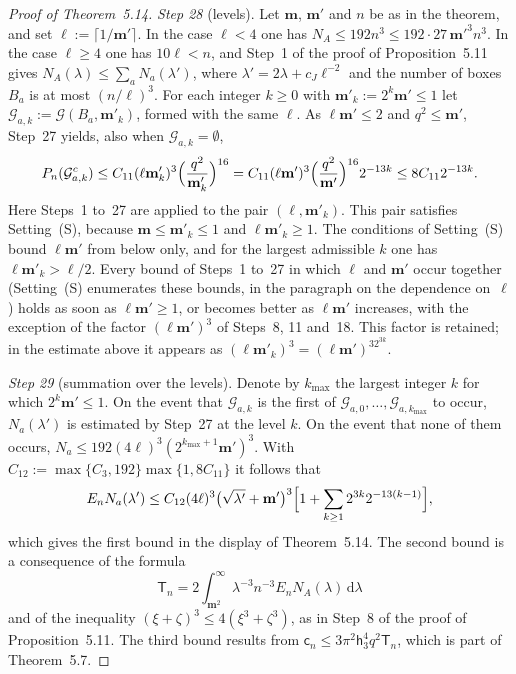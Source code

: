 \documentclass[11pt,letterpaper,reqno]{amsart}
\theoremstyle{definition}
\begin{document}
\begin{proof}[Proof of Theorem~5.14]
\emph{Step 28} (levels).
Let $\mathbf m$, $\mathbf m'$ and $n$ be as in the theorem, and set $\ell:=\lceil1/\mathbf m'\rceil$.
In the case $\ell<4$ one has $N_A\le192n^3\le192\cdot27\,\mathbf m'^3n^3$.
In the case $\ell\ge4$ one has $10\ell<n$, and Step~1 of the proof of Proposition~5.11 gives $N_A(\lambda)\le\sum_aN_a(\lambda')$, where $\lambda'=2\lambda+c_J\ell^{-2}$ and the number of boxes $B_a$ is at most $(n/\ell)^3$.
For each integer $k\ge0$ with $\mathbf m'_k:=2^k\mathbf m'\le1$ let $\mathcal G_{a,k}:=\mathcal G(B_a,\mathbf m'_k)$, formed with the same $\ell$.
As $\ell\mathbf m'\le2$ and $q^2\le\mathbf m'$, Step~27 yields, also when $\mathcal G_{a,k}=\emptyset$,
\begin{equation*}
P_n(\mathcal G_{a,k}^c)\le C_{11}(\ell\mathbf m'_k)^3\Bigl(\frac{q^2}{\mathbf m'_k}\Bigr)^{16}=C_{11}(\ell\mathbf m')^3\Bigl(\frac{q^2}{\mathbf m'}\Bigr)^{16}2^{-13k}\le8C_{11}2^{-13k}.
\end{equation*}
Here Steps~1 to~27 are applied to the pair $(\ell,\mathbf m'_k)$.
This pair satisfies Setting~(S), because $\mathbf m\le\mathbf m'_k\le1$ and $\ell\mathbf m'_k\ge1$.
The conditions of Setting~(S) bound $\ell\mathbf m'$ from below only, and for the largest admissible $k$ one has $\ell\mathbf m'_k>\ell/2$.
Every bound of Steps~1 to~27 in which $\ell$ and $\mathbf m'$ occur together (Setting~(S) enumerates these bounds, in the paragraph on the dependence on~$\ell$) holds as soon as $\ell\mathbf m'\ge1$, or becomes better as $\ell\mathbf m'$ increases, with the exception of the factor $(\ell\mathbf m')^3$ of Steps~8, 11 and~18.
This factor is retained; in the estimate above it appears as $(\ell\mathbf m'_k)^3=(\ell\mathbf m')^32^{3k}$.

\emph{Step 29} (summation over the levels).
Denote by $k_{\max}$ the largest integer $k$ for which $2^k\mathbf m'\le1$.
On the event that $\mathcal G_{a,k}$ is the first of $\mathcal G_{a,0},\dots,\mathcal G_{a,k_{\max}}$ to occur, $N_a(\lambda')$ is estimated by Step~27 at the level $k$.
On the event that none of them occurs, $N_a\le192(4\ell)^3(2^{k_{\max}+1}\mathbf m')^3$.
With $C_{12}:=\max\{C_3,192\}\max\{1,8C_{11}\}$ it follows that
\begin{equation*}
E_nN_a(\lambda')\le C_{12}(4\ell)^3\bigl(\sqrt{\lambda'}+\mathbf m'\bigr)^3\Bigl[1+\sum_{k\ge1}2^{3k}2^{-13(k-1)}\Bigr],
\end{equation*}
which gives the first bound in the display of Theorem~5.14.
The second bound is a consequence of the formula
\begin{equation*}
\mathsf T_n=2\int_{\mathbf m^2}^\infty\lambda^{-3}n^{-3}E_nN_A(\lambda)\,\mathrm d\lambda
\end{equation*}
and of the inequality $(\xi+\zeta)^3\le4(\xi^3+\zeta^3)$, as in Step~8 of the proof of Proposition~5.11.
The third bound results from $\mathsf c_n\le3\pi^2\mathsf h_3^4q^2\mathsf T_n$, which is part of Theorem~5.7.


\end{proof}
\end{document}
